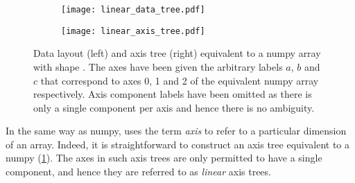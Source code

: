 \documentclass[thesis]{subfiles}
\begin{document}
\begin{figure}
  \centering
  \begin{subfigure}{.49\textwidth}
    \centering
    \texttt{[image: linear\_data\_tree.pdf]}
  \end{subfigure}
  \begin{subfigure}{.49\textwidth}
    \centering
    \texttt{[image: linear\_axis\_tree.pdf]}
  \end{subfigure}
  \caption{
    Data layout (left) and axis tree (right) equivalent to a numpy array with shape .
    The axes have been given the arbitrary labels $a$, $b$ and $c$ that correspond to axes 0, 1 and 2 of the equivalent numpy array respectively.
    Axis component labels have been omitted as there is only a single component per axis and hence there is no ambiguity.
  }
  \label{fig:numpy_axis_tree}
\end{figure}

In the same way as numpy,  uses the term \textit{axis} to refer to a particular dimension of an array.
Indeed, it is straightforward to construct an axis tree equivalent to a numpy  (\cref{fig:numpy_axis_tree}).
The axes in such axis trees are only permitted to have a single component, and hence they are referred to as \textit{linear} axis trees.
\end{document}
